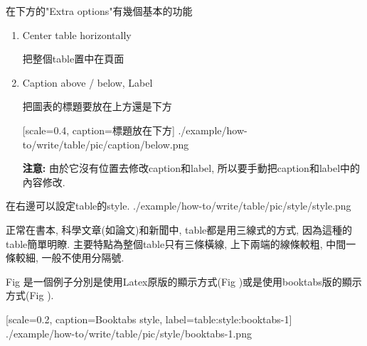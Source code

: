 \newpage
{}

  在下方的"Extra options"有幾個基本的功能

\begin{enumerate}

  \item
  {
  Center table horizontally

  把整個table置中在頁面

  } %

  \label{chapter:how-to:write:table:label-example}
  \item
  {
  Caption above / below, Label

  把圖表的標題要放在上方還是下方

    {
      [scale=0.4,
      caption={標題放在下方}]
      {./example/how-to/write/table/pic/caption/below.png}
    }

  {\bf 注意:} 由於它沒有位置去修改caption和label, 所以要手動把caption和label中的內容修改.
  } %
\end{enumerate}

\newpage
{}

  在右邊可以設定table的style.
  \InsertCenterImage
    {./example/how-to/write/table/pic/style/style.png}

   正常在書本, 科學文章(如論文)和新聞中, table都是用三線式的方式, 因為這種的table簡單明瞭. 主要特點為整個table只有三條橫線, 上下兩端的線條較粗, 中間一條較細, 一般不使用分隔號.

  Fig 是一個例子分別是使用Latex原版的顯示方式(Fig )或是使用booktabs版的顯示方式(Fig ).

    {
      [scale=0.2,
      caption={Booktabs style},
      label={table:style:booktabs-1}]
      {./example/how-to/write/table/pic/style/booktabs-1.png}
    }

